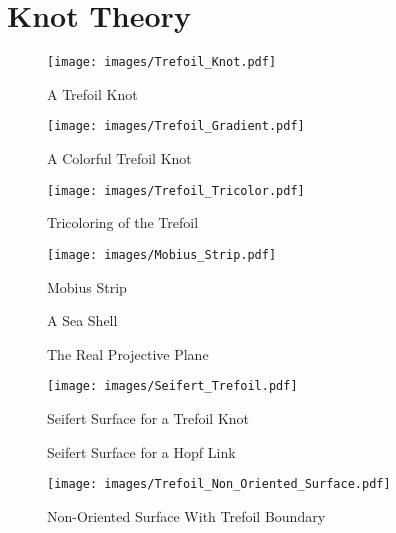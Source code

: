 \chapter{Knot Theory}
    \begin{figure}[H]
        \centering
        \texttt{[image: images/Trefoil\_Knot.pdf]}
        \caption{A Trefoil Knot}
        \label{fig:Trefoil_Knot}
    \end{figure}
    \begin{figure}[H]
        \centering
        \texttt{[image: images/Trefoil\_Gradient.pdf]}
        \caption{A Colorful Trefoil Knot}
        \label{fig:Colorful_Trefoil_Knot}
    \end{figure}
    \begin{figure}[H]
        \centering
        \texttt{[image: images/Trefoil\_Tricolor.pdf]}
        \caption{Tricoloring of the Trefoil}
        \label{fig:Trefoil_Tricoloring}
    \end{figure}
    \begin{figure}[H]
        \centering
        \texttt{[image: images/Mobius\_Strip.pdf]}
        \caption{Mobius Strip}
        \label{fig:Mobius_Strip}
    \end{figure}
    \begin{figure}[H]
        \centering
        \caption{A Sea Shell}
        \label{fig:Sea_Shell}
    \end{figure}
    \begin{figure}[H]
        \centering
        \caption{The Real Projective Plane}
        \label{fig:Real_Projective_Plane}
    \end{figure}
    \begin{figure}[H]
        \centering
        \texttt{[image: images/Seifert\_Trefoil.pdf]}
        \caption{Seifert Surface for a Trefoil Knot}
        \label{fig:Seifert_Surface_Trefoil}
    \end{figure}
    \begin{figure}[H]
        \centering
        \caption{Seifert Surface for a Hopf Link}
        \label{fig:Seifert_Surface_Hopf_Link}
    \end{figure}
    \begin{figure}[H]
        \centering
        \texttt{[image: images/Trefoil\_Non\_Oriented\_Surface.pdf]}
        \caption{Non-Oriented Surface With Trefoil Boundary}
        \label{fig:Trefoil_Non_Oriented_Surface}
    \end{figure}